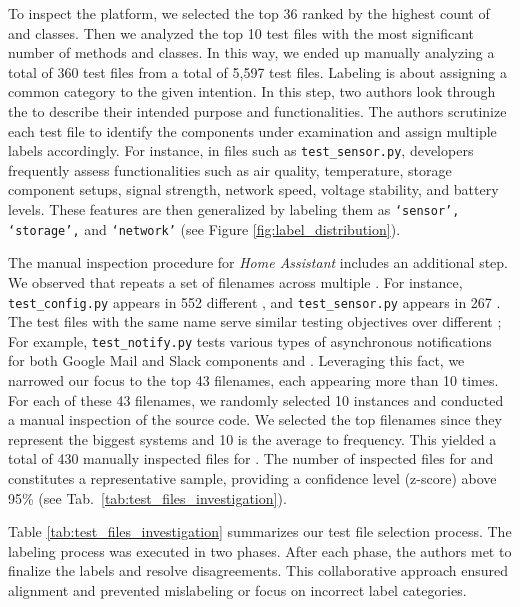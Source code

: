 To inspect the  \openhab platform, we selected the top 36 \addons ranked by the highest count of \ftm and classes. Then we analyzed the top 10 test files with the most significant number of methods and classes. In this way, we ended up manually analyzing a total of 360 test files from a total of 5,597 test files.  Labeling is about assigning a common category to the given \ftm intention. In this step, two authors look through the \ftm to describe their intended purpose and functionalities. The authors scrutinize each test file to identify the components under examination and assign multiple labels accordingly. For instance, in files such as \texttt{test\_sensor.py}, developers frequently assess functionalities such as air quality, temperature, storage component setups, signal strength, network speed, voltage stability, and battery levels. These features are then generalized by labeling them as \texttt{`sensor', `storage',} and \texttt{`network'} (see Figure \ref{fig:label_distribution}).

The manual inspection procedure for \textit{Home Assistant} includes an additional step. We observed that \homeassistant repeats a set of filenames across multiple \addons. For instance, \texttt{test\_config.py} appears in 552 different \addons, and \texttt{test\_sensor.py} appears in 267 \addons.  The test files with the same name serve similar testing objectives over different \addons; For example, \texttt{test\_notify.py} tests various types of asynchronous notifications for both Google Mail and Slack components and \addons. Leveraging this fact, we narrowed our focus to the top 43 filenames, each appearing more than 10 times. For each of these 43 filenames, we randomly selected 10 instances and conducted a manual inspection of the source code. We selected the top filenames since they represent the biggest \iot systems and 10 is the average to frequency. This yielded a total of 430 manually inspected files for \homeassistant. The number of inspected files for \openhab and \homeassistant constitutes a representative sample, providing a confidence level (z-score) above 95\% (see Tab.~\ref{tab:test_files_investigation}).

Table \ref{tab:test_files_investigation} summarizes our test file selection process. The labeling process was executed in two phases. After each phase, the authors met to finalize the labels and resolve disagreements. This collaborative approach ensured alignment and prevented mislabeling or focus on incorrect label categories.





